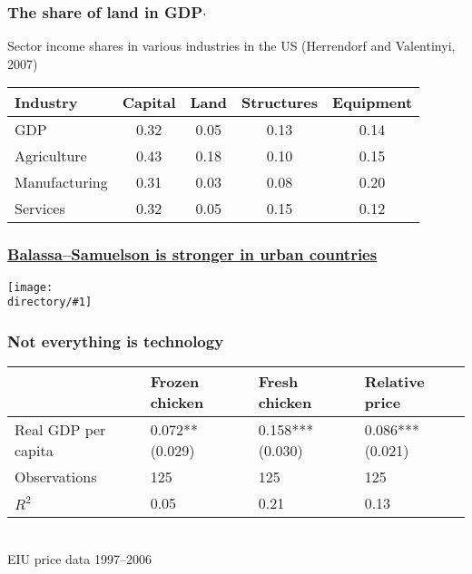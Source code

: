 \documentclass[compress,mathserif]{beamer}
\newcounter{perc}
\newcounter{percek}
\newcommand{\directory}{figures}
\newcommand{\widefigure}[2]{\begin{frame}\frametitle{\hyperlink{#1back}{#2}}\hypertarget{#1}{{\begin{center}\texttt{[image: \\directory/\#1]}\end{center}}}\end{frame}}
\renewcommand{\time}[1]{\addtocounter{percek}{#1}}
\begin{document}
\begin{frame}\frametitle{The share of land in GDP$\cdot$}
Sector income shares in various industries in the US (Herrendorf and Valentinyi, 2007)
\begin{center}
\begin{tabular}{l|c|ccc}
\hline\hline
Industry    & Capital   &   Land    & Structures    & Equipment \\ \hline
GDP         &   0.32    &   0.05    & 0.13          & 0.14      \\ \hline
Agriculture & 0.43      &   0.18    & 0.10          & 0.15      \\
Manufacturing & 0.31    &   0.03    & 0.08          & 0.20      \\
Services    & 0.32      & 0.05      & 0.15          & 0.12      \\ \hline\hline
\end{tabular}
\end{center}
\end{frame}

\widefigure{sc_penn}{Balassa--Samuelson is stronger in urban countries}

\time{2}

\begin{frame}\frametitle{Not everything is technology}
\begin{center}
\begin{tabular}{lm{5em}m{5em}m{5em}}
  \hline
   & Frozen chicken & Fresh chicken & Relative price\\
   \hline
  Real GDP per capita & 0.072**   (0.029) & 0.158***   (0.030) & 0.086***   (0.021)\\
\hline
  Observations &  125 & 125 & 125
\\
  $R^2$ &  0.05& 0.21 & 0.13
\\
  \hline
\end{tabular}\\
{\small EIU price data 1997--2006}
\end{center}
\end{frame}

\time 2

\end{document}
